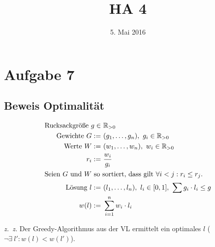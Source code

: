 



\title{HA 4}
\date{5. Mai 2016}

\maketitle

\section*{Aufgabe 7}
\label{sec:Aufgabe 7}

\subsection{Beweis Optimalität}
\label{sub:Beweis Optimalität}

\begin{align*}
	\text{Rucksackgröße}\ g \in&\ \mathbb{R}_{> 0}\\
	\text{Gewichte}\ G :=&\ (g_1, \dots, g_n),\ g_i \in \mathbb{R}_{> 0}\\
	\text{Werte}\ W :=&\ (w_1, \dots, w_n),\ w_i \in \mathbb{R}_{> 0}\\
	r_i :=&\ \frac{w_i}{g_i}\\
	\intertext{Seien $G$ und $W$ so sortiert, dass gilt $\forall i < j: r_i \le r_j$.}
	\text{Lösung}\ l :=&\ (l_1, \dots, l_n),\ l_i \in [0, 1],\ \sum g_i \cdot l_i \le g\\
	w(l) :=&\ \sum_{i = 1}^{n} w_i \cdot l_i
\end{align*}

\emph{z.\ z.} Der Greedy-Algorithmus aus der VL ermittelt ein optimales $l$ ($\neg \exists\ l': w(l) < w(l')$).\\

